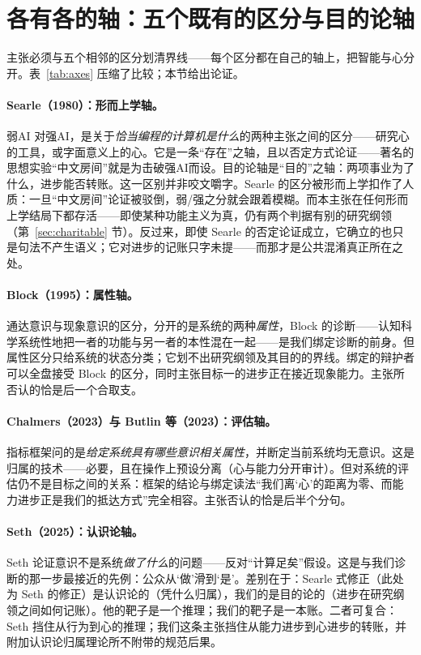 \documentclass[10pt,fontset=fandol]{ctexart}
\begin{document}
\section{各有各的轴：五个既有的区分与目的论轴}\label{sec:axes}

主张必须与五个相邻的区分划清界线——每个区分都在自己的轴上，把智能与心分开。表~\ref{tab:axes} 压缩了比较；本节给出论证。

\paragraph{Searle（1980）：形而上学轴。}弱AI 对强AI，是关于\emph{恰当编程的计算机是什么}的两种主张之间的区分——研究心的工具，或字面意义上的心\cite{searle1980}。它是一条“存在”之轴，且以否定方式论证——著名的思想实验“中文房间”就是为击破强AI而设。目的论轴是“目的”之轴：两项事业为了什么，进步能否转账。这一区别并非咬文嚼字。Searle 的区分被形而上学扣作了人质：一旦“中文房间”论证被驳倒，弱/强之分就会跟着模糊。而本主张在任何形而上学结局下都存活——即使某种功能主义为真，仍有两个判据有别的研究纲领（第~\ref{sec:charitable} 节）。反过来，即使 Searle 的否定论证成立，它确立的也只是句法不产生语义；它对进步的记账只字未提——而那才是公共混淆真正所在之处。

\paragraph{Block（1995）：属性轴。}通达意识与现象意识的区分，分开的是系统的两种\emph{属性}，Block 的诊断——认知科学系统性地把一者的功能与另一者的本性混在一起\cite{block1995}——是我们绑定诊断的前身。但属性区分只给系统的状态分类；它划不出研究纲领及其目的的界线。绑定的辩护者可以全盘接受 Block 的区分，同时主张目标一的进步正在接近现象能力。主张所否认的恰是后一个合取支。

\paragraph{Chalmers（2023）与 Butlin 等（2023）：评估轴。}指标框架问的是\emph{给定系统具有哪些意识相关属性}，并断定当前系统均无意识\cite{chalmers2023llm,butlin2023consciousness}。这是归属的技术——必要，且在操作上预设分离（心与能力分开审计）。但对系统的评估仍不是目标之间的关系：框架的结论与绑定读法“我们离‘心’的距离为零、而能力进步正是我们的抵达方式”完全相容。主张否认的恰是后半个分句。

\paragraph{Seth（2025）：认识论轴。}Seth 论证意识不是系统\emph{做了什么}的问题——反对“计算足矣”假设\cite{seth2025conscious}。这是与我们诊断的那一步最接近的先例：公众从‘做’滑到‘是’。差别在于：Searle 式修正（此处为 Seth 的修正）是认识论的（凭什么归属），我们的是目的论的（进步在研究纲领之间如何记账）。他的靶子是一个推理；我们的靶子是一本账。二者可复合：Seth 挡住从行为到心的推理；我们这条主张挡住从能力进步到心进步的转账，并附加认识论归属理论所不附带的规范后果。
\end{document}
